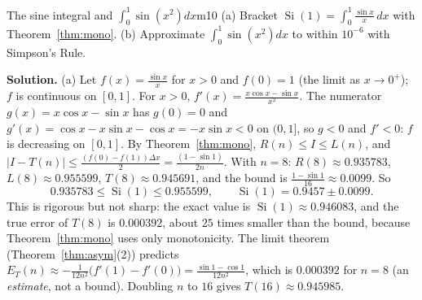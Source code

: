 \documentclass[11pt]{article}
\begin{document}
\begin{exmp}{The sine integral and $\int_0^1\sin\left(x^2\right)dx$}{m10}
(a) Bracket $\operatorname{Si}(1)=\int_0^1\frac{\sin x}x\,dx$ with Theorem~\ref{thm:mono}. (b) Approximate $\int_0^1\sin\left(x^2\right)dx$ to within $10^{-6}$ with Simpson's Rule.

\textbf{Solution.} (a) Let $f(x)=\frac{\sin x}x$ for $x>0$ and $f(0)=1$ (the limit as $x\to0^+$); $f$ is continuous on $[0,1]$. For $x>0$, $f'(x)=\frac{x\cos x-\sin x}{x^2}$. The numerator $g(x)=x\cos x-\sin x$ has $g(0)=0$ and $g'(x)=\cos x-x\sin x-\cos x=-x\sin x<0$ on $(0,1]$, so $g<0$ and $f'<0$: $f$ is decreasing on $[0,1]$. By Theorem~\ref{thm:mono}, $R(n)\le I\le L(n)$, and $\lvert I-T(n)\rvert\le\frac{(f(0)-f(1))\Delta x}2=\frac{(1-\sin1)}{2n}$. With $n=8$: $R(8)\approx0.935783$, $L(8)\approx0.955599$, $T(8)\approx0.945691$, and the bound is $\frac{1-\sin1}{16}\approx0.0099$. So
\[0.935783\le\operatorname{Si}(1)\le0.955599,\qquad\operatorname{Si}(1)=0.9457\pm0.0099 .\]
This is rigorous but not sharp: the exact value is $\operatorname{Si}(1)\approx0.946083$, and the true error of $T(8)$ is $0.000392$, about $25$ times smaller than the bound, because Theorem~\ref{thm:mono} uses only monotonicity. The limit theorem (Theorem~\ref{thm:asym}(2)) predicts $E_T(n)\approx-\frac1{12n^2}\big(f'(1)-f'(0)\big)=\frac{\sin1-\cos1}{12n^2}$, which is $0.000392$ for $n=8$ (an \emph{estimate}, not a bound). Doubling $n$ to $16$ gives $T(16)\approx0.945985$.


\end{exmp}
\end{document}
